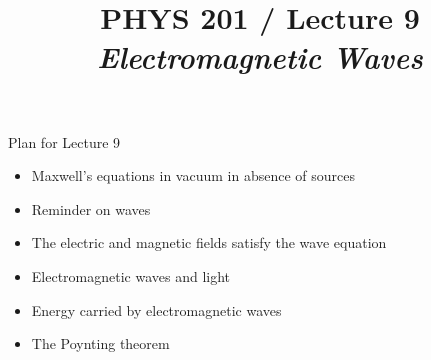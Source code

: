 \renewcommand{\prevlecture}{8 }
\renewcommand{\thislecture}{9 }
\renewcommand{\nextlecture}{10 }

%
%

\title[PHYS 201 / Lecture \thislecture]
{
  PHYS 201 / Lecture \thislecture\\
  {\it Electromagnetic Waves}\\
}



\begin{frame}[plain]
  \titlepage
\end{frame}



%
%

\renewcommand{\lecturesummarytitle}{Revision }


%
%

\begin{frame}{Plan for Lecture \thislecture}

\begin{itemize}
   \item Maxwell's equations in vacuum in absence of sources
   \item Reminder on waves
   \item The electric and magnetic fields satisfy the wave equation
   \item Electromagnetic waves and light
   \item Energy carried by electromagnetic waves
   \item The Poynting theorem
\end{itemize}

\end{frame}



%
%
%

